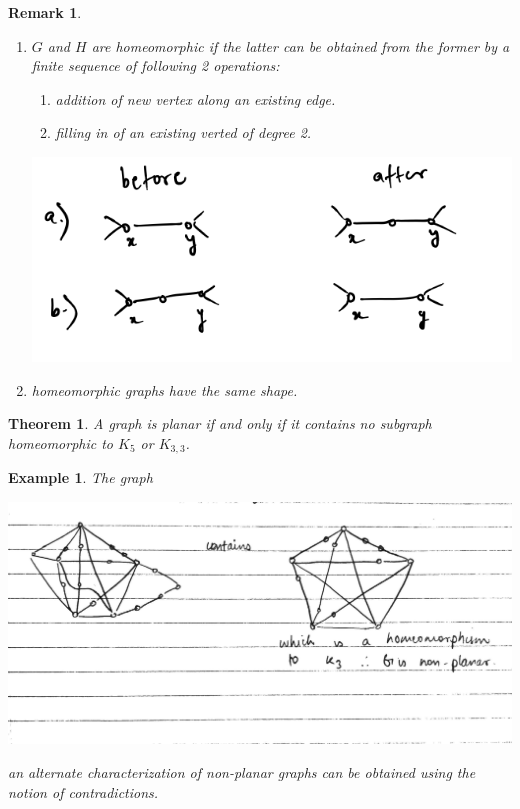 \documentclass[12pt]{article}
\newtheorem{theorem}{Theorem}
\newtheorem{example}{Example}
\newtheorem*{remark}{Remark}
\begin{document}
\begin{remark}

  \begin{enumerate}
    \item $G$ and $H$ are homeomorphic if the latter can be obtained from the former by a finite sequence of following 2 operations:
          \begin{enumerate}
            \item addition of new vertex along an existing edge.
            \item filling in of an existing verted of degree 2.
          \end{enumerate}

          \begin{center}
          \includegraphics[scale=0.5]{remarkgraph}
          \end{center}
    \item homeomorphic graphs have the same shape.
  \end{enumerate}
\end{remark}



\begin{theorem}
A graph is planar if and only if it contains no subgraph homeomorphic to $K_{5}$ or $K_{3,3}$.
\end{theorem}


\begin{example}
  The graph

  \includegraphics[scale=0.2]{petersan}


  an alternate characterization of non-planar graphs can be obtained using the notion of contradictions.
\end{example}
\end{document}
